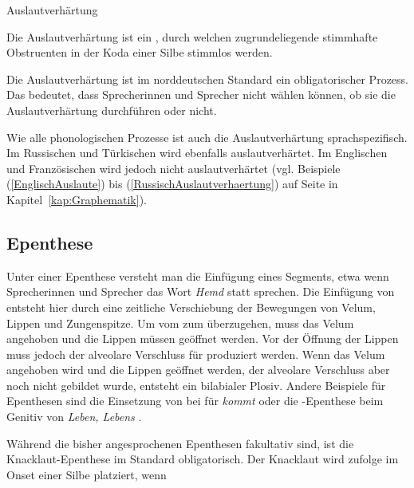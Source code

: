 \begin{Definition}{Auslautverhärtung}

\noindent Die Auslautverhärtung ist ein , durch welchen zugrundeliegende stimmhafte Obstruenten in der Koda einer Silbe stimmlos werden.

\end{Definition}


Die Auslautverhärtung ist im norddeutschen Standard ein obligatorischer Prozess. Das bedeutet, dass Sprecherinnen und Sprecher nicht wählen können, ob sie die Auslautverhärtung durchführen oder nicht.

Wie alle phonologischen Prozesse ist auch die Auslautverhärtung sprachspezifisch. Im Russischen und Türkischen wird ebenfalls auslautverhärtet. Im Englischen und Französischen wird jedoch nicht auslautverhärtet (vgl. Beispiele (\ref{EnglischAuslaute}) bis (\ref{RussischAuslautverhaertung}) auf Seite \pageref{EnglischAuslaute} in Kapitel~\ref{kap:Graphematik}).


\subsection{Epenthese}\label{sec:Epenthese}

Unter einer Epenthese versteht man die Einfügung eines Segments, etwa wenn Sprecherinnen und Sprecher das Wort \textit{Hemd} \textipa{[hEmpt]} statt \textipa{[hEmt]} sprechen. Die Einfügung von \textipa{[p]} entsteht hier durch eine zeitliche Verschiebung der Bewegungen von Velum, Lippen und Zungenspitze. Um vom \textipa{[m]} zum \textipa{[t]} überzugehen, muss das Velum angehoben und die Lippen müssen geöffnet werden. Vor der Öffnung der Lippen muss jedoch der alveolare Verschluss für \textipa{[t]} produziert werden. Wenn das Velum angehoben wird und die Lippen geöffnet werden, der alveolare Verschluss aber noch nicht gebildet wurde, entsteht ein bilabialer Plosiv. Andere Beispiele für Epenthesen sind die Einsetzung von \textipa{[p]} bei \textipa{[kOmpt]} für \textit{kommt} oder die \textipa{[t]}-Epenthese beim Genitiv von \textit{Leben, Lebens} .

Während die bisher angesprochenen Epenthesen fakultativ sind, ist die Knacklaut-Epenthese im Standard obligatorisch. Der Knacklaut \textipa{[P]} wird \citet[65]{Hall2000} zufolge im Onset einer Silbe platziert, wenn

